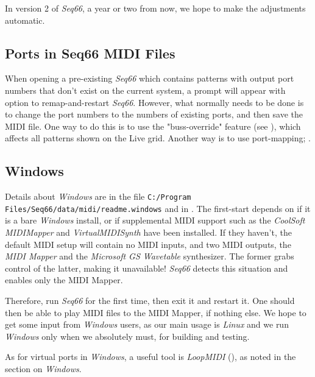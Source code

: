    In version 2 of \textsl{Seq66}, a year or two from now, we hope to make
   the adjustments automatic.

\subsection{Ports in Seq66 MIDI Files}
\label{subsec:introduction_ports}

   When opening a pre-existing \textsl{Seq66} which contains patterns with
   output port numbers that don't exist on the current system, a prompt
   will appear with option to remap-and-restart \textsl{Seq66}.
   However, what normally needs to be done is to change the
   port numbers to the numbers of existing ports, and then save the MIDI file.
   One way to do this is to use the "buss-override" feature
   (see ),
   which affects all patterns shown on the Live grid.
   Another way is to use port-mapping;
   .

\subsection{Windows}
\label{subsec:introduction_windows}


   Details about \textsl{Windows} are in the file
   \texttt{C:/Program Files/Seq66/data/midi/readme.windows}
   and in .
   The first-start depends on if it is a bare \textsl{Windows}
   install, or if supplemental MIDI support such as 
   the 
   \textsl{CoolSoft MIDIMapper} and 
   \textsl{VirtualMIDISynth} have been installed.
   If they haven't, the default MIDI setup will contain no MIDI inputs,
   and two MIDI outputs, the \textsl{MIDI Mapper} and the
   \textsl{Microsoft GS Wavetable} synthesizer.
   The former grabs control of the latter, making it unavailable!
   \textsl{Seq66} detects this situation and enables only the MIDI Mapper.

   Therefore, run \textsl{Seq66} for the first time, then exit it and
   restart it. One should then be able to play MIDI files to the MIDI Mapper,
   if nothing else.
   We hope to get some input from
   \textsl{Windows} users, as our main usage is \textsl{Linux}
   and we run \textsl{Windows} only when we absolutely must, for building
   and testing.

   As for virtual ports in \textsl{Windows}, a useful tool
   is \textsl{LoopMIDI} (\cite{loopmidi}), as noted in the section
   on \textsl{Windows}.

